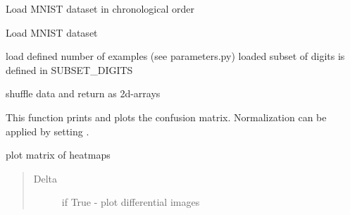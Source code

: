 \documentclass[letterpaper,10pt,english]{sphinxmanual}
\begin{document}

\begin{fulllineitems}
\label{\detokenize{SpikingConvNet:SpikingConvNet.utils.load_MNIST_digits_ordered}}
Load MNIST dataset in chronological order

\end{fulllineitems}


\begin{fulllineitems}
\label{\detokenize{SpikingConvNet:SpikingConvNet.utils.load_MNIST_digits_shuffled}}
Load MNIST dataset

load defined number of examples (see parameters.py)
loaded subset of digits is defined in SUBSET\_DIGITS

shuffle data and return as 2d-arrays

\end{fulllineitems}


\begin{fulllineitems}
\label{\detokenize{SpikingConvNet:SpikingConvNet.utils.plot_confusion_matrix}}
This function prints and plots the confusion matrix.
Normalization can be applied by setting .

\end{fulllineitems}


\begin{fulllineitems}
\label{\detokenize{SpikingConvNet:SpikingConvNet.utils.plot_heatpmap}}
plot matrix of heatmaps
\begin{quote}\begin{description}
\item[{Delta}] \leavevmode
if True - plot differential images

\end{description}\end{quote}

\end{fulllineitems}
\end{document}
